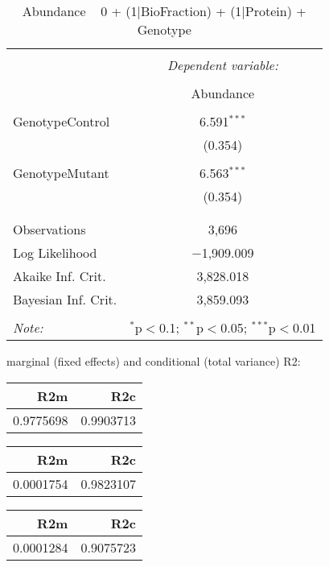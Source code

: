 \documentclass[11pt]{report}
\begin{document}
\begin{table}[!htbp] \centering 
  \caption{Abundance ~ 0 + (1|BioFraction) + (1|Protein) + Genotype} 
  \label{} 
\begin{tabular}{@{\extracolsep{5pt}}lc} 
\\[-1.8ex]\hline 
\hline \\[-1.8ex] 
 & \multicolumn{1}{c}{\textit{Dependent variable:}} \\ 
\cline{2-2} 
\\[-1.8ex] & Abundance \\ 
\hline \\[-1.8ex] 
 GenotypeControl & 6.591$^{***}$ \\ 
  & (0.354) \\ 
  & \\ 
 GenotypeMutant & 6.563$^{***}$ \\ 
  & (0.354) \\ 
  & \\ 
\hline \\[-1.8ex] 
Observations & 3,696 \\ 
Log Likelihood & $-$1,909.009 \\ 
Akaike Inf. Crit. & 3,828.018 \\ 
Bayesian Inf. Crit. & 3,859.093 \\ 
\hline 
\hline \\[-1.8ex] 
\textit{Note:}  & \multicolumn{1}{r}{$^{*}$p$<$0.1; $^{**}$p$<$0.05; $^{***}$p$<$0.01} \\ 
\end{tabular} 
\end{table} 
marginal (fixed effects) and conditional (total variance) R2:

\begin{tabular}{r|r}
\hline
R2m & R2c\\
\hline
0.9775698 & 0.9903713\\
\hline
\end{tabular}

\begin{tabular}{r|r}
\hline
R2m & R2c\\
\hline
0.0001754 & 0.9823107\\
\hline
\end{tabular}

\begin{tabular}{r|r}
\hline
R2m & R2c\\
\hline
0.0001284 & 0.9075723\\
\hline
\end{tabular}
\end{document}
